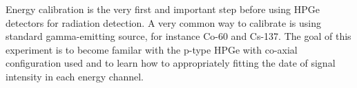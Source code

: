 Energy calibration is the very first and important step before using HPGe detectors for radiation detection. A very common way to calibrate is using standard gamma-emitting source, for instance Co-60 and Cs-137. The goal of this experiment is to become familar with the p-type HPGe with co-axial configuration used and to learn how to appropriately fitting the date of signal intensity in each energy channel.
